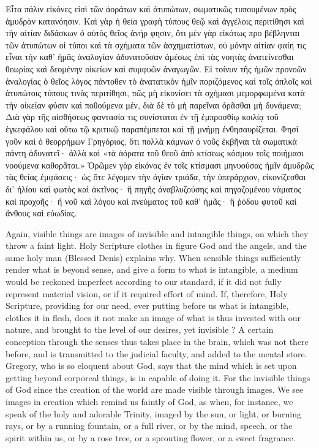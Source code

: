 \documentclass[10pt]{book}
\newcommand{\switchEnglish}{\selectlanguage{english} \switchcolumn}
\begin{document}
\begin{paracol}{2}
Εἶτα πάλιν εἰκόνες εἰσὶ τῶν ἀοράτων καὶ ἀτυπώτων, σωματικῶς τυπουμένων πρὸς ἀμυδρὰν κατανόησιν. Καὶ γὰρ ἡ θεία γραφὴ τύπους θεῷ καὶ ἀγγέλοις περιτίθησι καὶ τὴν αἰτίαν διδάσκων ὁ αὐτὸς θεῖος ἀνήρ φησιν, ὅτι μὲν γὰρ εἰκότως προ βέβληνται τῶν ἀτυπώτων οἱ τύποι καὶ τὰ σχήματα τῶν ἀσχηματίστων, οὐ μόνην αἰτίαν φαίη τις εἶναι τὴν καθ’ ἡμᾶς ἀναλογίαν ἀδυνατοῦσαν ἀμέσως ἐπὶ τὰς νοητὰς ἀνατείνεσθαι θεωρίας καὶ δεομένην οἰκείων καὶ συμφυῶν ἀναγωγῶν. Εἰ τοίνυν τῆς ἡμῶν προνοῶν ἀναλογίας ὁ θεῖος λόγος πάντοθεν τὸ ἀνατατικὸν ἡμῖν ποριζόμενος καὶ τοῖς ἁπλοῖς καὶ ἀτυπώτοις τύπους τινὰς περιτίθησι, πῶς μὴ εἰκονίσει τὰ σχήμασι μεμορφωμένα κατὰ τὴν οἰκείαν φύσιν καὶ ποθούμενα μέν, διὰ δὲ τὸ μὴ παρεῖναι ὁρᾶσθαι μὴ δυνάμενα; Διὰ γὰρ τῆς αἰσθήσεως φαντασία τις συνίσταται ἐν τῇ ἐμπροσθίῳ κοιλίᾳ τοῦ ἐγκεφάλου καὶ οὕτω τῷ κριτικῷ παραπέμπεται καὶ τῇ μνήμῃ ἐνθησαυρίζεται. Φησὶ γοῦν καὶ ὁ θεορρήμων Γρηγόριος, ὅτι πολλὰ κάμνων ὁ νοῦς ἐκβῆναι τὰ σωματικὰ πάντη ἀδυνατεῖ· ἀλλὰ καὶ «τὰ ἀόρατα τοῦ θεοῦ ἀπὸ κτίσεως κόσμου τοῖς ποιήμασι νοούμενα καθορᾶται.» Ὁρῶμεν γὰρ εἰκόνας ἐν τοῖς κτίσμασι μηνυούσας ἡμῖν ἀμυδρῶς τὰς θείας ἐμφάσεις· ὡς ὅτε λέγομεν τὴν ἁγίαν τριάδα, τὴν ὑπεράρχιον, εἰκονίζεσθαι δι’ ἡλίου καὶ φωτὸς καὶ ἀκτῖνος· ἢ πηγῆς ἀναβλυζούσης καὶ πηγαζομένου νάματος καὶ προχοῆς· ἢ νοῦ καὶ λόγου καὶ πνεύματος τοῦ καθ’ ἡμᾶς· ἢ ῥόδου φυτοῦ καὶ ἄνθους καὶ εὐωδίας.

\switchEnglish

Again, visible things are images of 
invisible and intangible things, on which they 
throw a faint light. Holy Scripture clothes in 
figure God and the angels, and the same holy 
man (Blessed Denis) explains why. When 
sensible things sufficiently render what is 
beyond sense, and give a form to what is 
intangible, a medium would be reckoned 
imperfect according to our standard, if it did 
not fully represent material vision, or if it 
required effort of mind. If, therefore, Holy 
Scripture, providing for our need, ever putting 
before us what is intangible, clothes it in flesh, 
does it not make an image of what is thus 
invested with our nature, and brought to the 
level of our desires, yet invisible ? A certain 
conception through the senses thus takes place 
in the brain, which was not there before, and is 
transmitted to the judicial faculty, and added to 
the mental store. Gregory, who is so eloquent 
about God, says that the mind which is set 
upon getting beyond corporeal things, is in 
capable of doing it. For the invisible things of 
God since the creation of the world are made 
visible through images. We see images in 
creation which remind us faintly of God, as 
when, for instance, we speak of the holy and 
adorable Trinity, imaged by the sun, or light, 
or burning rays, or by a running fountain, or a 
full river, or by the mind, speech, or the spirit 
within us, or by a rose tree, or a sprouting 
flower, or a sweet fragrance. 


\end{paracol}
\end{document}
